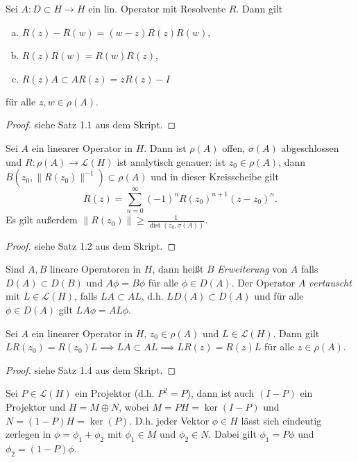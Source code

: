 \documentclass{mycourse}
\newcommand{\dist}{\operatorname{dist}}
\begin{document}
\begin{st}\label{1.1}
Sei $A: D \subset H\to H$ ein lin. Operator mit Resolvente $R$. Dann gilt
\begin{enumerate}[a)]
\item $R(z)-R(w)=(w-z) R(z) R(w)$,
\item $R(z) R(w)=R(w) R(z)$,
\item $R(z) A\subset A R(z)=zR(z)-I$
\end{enumerate}
für alle $z,w\in \rho(A)$.
\end{st}
\begin{proof}
siehe Satz 1.1 aus dem Skript.
\end{proof}
\begin{st} \label{1.2} Sei $A$ ein linearer Operator in $H$. Dann ist $\rho(A)$ offen, $\sigma(A)$ abgeschlossen und $R: \rho(A) \to \mathcal L(H)$ ist analytisch genauer: ist $z_0\in \rho(A)$, dann $B(z_0, \| R(z_0)\|^{-1}) \subset \rho(A)$ und in dieser Kreisscheibe gilt
\[
R(z)=\sum_{n=0}^\infty (-1)^n R(z_0)^{n+1} (z-z_0)^n.
\]
Es gilt außerdem $\|R(z_0)\|\ge \frac{1}{\dist(z_0, \sigma(A))}$.
\end{st}
\begin{proof}
siehe Satz 1.2 aus dem Skript.
\end{proof}
\begin{seg}[Erinnerung]
Sind $A,B$ lineare Operatoren in $H$, dann heißt $B$ \emph{Erweiterung} von $A$ falls $D(A) \subset D(B)$ und $A\phi=B\phi$ für alle $\phi \in D(A)$. Der Operator $A$ \emph{vertauscht} mit $L\in \mathcal L(H)$, falls $LA\subset AL$, d.h. $LD(A)\subset D(A)$ und für alle $\phi \in D(A)$ gilt $LA\phi=AL\phi$.
\end{seg}
\begin{st}
Sei $A$ ein linearer Operator in $H$, $z_0\in \rho(A)$ und $L\in \mathcal L(H)$. Dann gilt $LR(z_0)=R(z_0)L \implies LA \subset AL \implies LR(z)=R(z)L$ für alle $z\in \rho(A)$.
\end{st}
\begin{proof}
siehe Satz 1.4 aus dem Skript.
\end{proof}

Sei $P\in \mathcal L(H)$ ein Projektor (d.h. $P^2=P$), dann ist auch $(I-P)$ ein Projektor und $H=M \oplus N$, wobei $M=PH=\ker(I-P)$ und $N=(1-P)H=\ker(P)$. D.h. jeder Vektor $\phi\in H$ lässt sich eindeutig zerlegen in $\phi=\phi_1+\phi_2$ mit $\phi_1\in M$ und $\phi_2\in N$. Dabei gilt $\phi_1=P\phi$ und $\phi_2=(1-P)\phi$.
\end{document}
